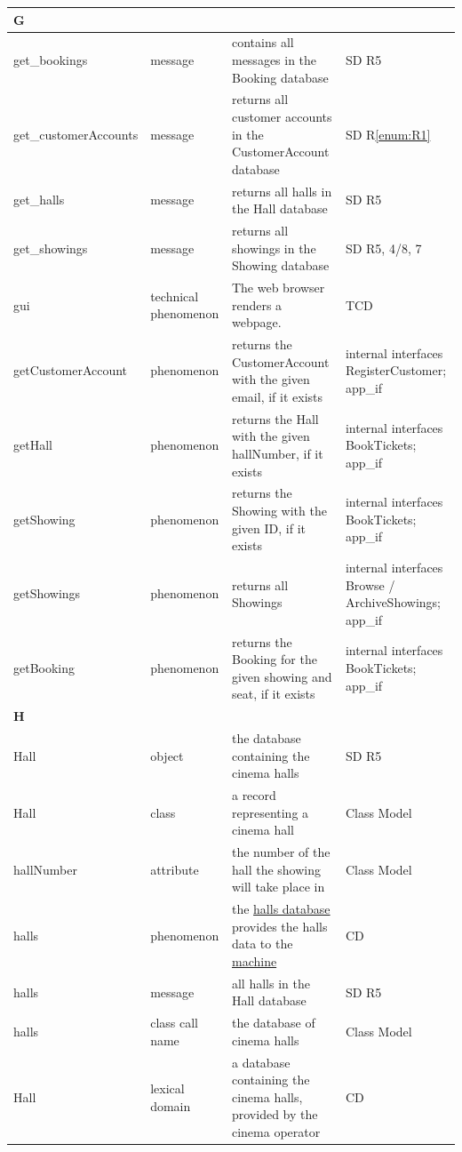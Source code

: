 \documentclass[a4paper,10pt,titlepage,bibtotoc,bibtotocnumbered]{scrreprt}
\begin{document}
\begin{longtable}{|p{.4\linewidth}|p{.2\linewidth}|p{.2\linewidth}|p{.2\linewidth}|}
\hline
\multicolumn{4}{|l|}{\textbf{G}}\\
\hline
get\_bookings & message & contains all messages in the Booking database & SD R5\\
\hline
get\_customerAccounts & message & returns all customer accounts in the CustomerAccount database & SD R\ref{enum:R1}\\
\hline
get\_halls & message & returns all halls in the Hall database & SD R5\\
\hline
get\_showings & message & returns all showings in the Showing database & SD R5, 4/8, 7\\
\hline
gui & technical phenomenon & The web browser renders a webpage. & TCD\\
\hline
getCustomerAccount & phenomenon & returns the CustomerAccount with the given email, if it exists & internal interfaces RegisterCustomer; app\_if\\
\hline
getHall & phenomenon & returns the Hall with the given hallNumber, if it exists & internal interfaces BookTickets; app\_if\\
\hline
getShowing & phenomenon & returns the Showing with the given ID, if it exists & internal interfaces BookTickets; app\_if\\
\hline
getShowings & phenomenon & returns all Showings & internal interfaces Browse / ArchiveShowings; app\_if\\
\hline
getBooking & phenomenon & returns the Booking for the given showing and seat, if it exists & internal interfaces BookTickets; app\_if\\
\hline
\multicolumn{4}{|l|}{\textbf{H}}\\
\hline
Hall & object & the database containing the cinema halls & SD R5\\
\hline
Hall & class & a record representing a cinema hall & Class Model\\
\hline
hallNumber & attribute & the number of the hall the showing will take place in & Class Model\\
\hline
\hypertarget{glossary:halls}{halls} & phenomenon & the \hyperlink{glossary:Hall}{halls database} provides the halls data to the \hyperlink{glossary:UDEKino}{machine} & CD\\
\hline
halls & message & all halls in the Hall database & SD R5\\
\hline
halls & class call name & the database of cinema halls & Class Model\\
\hline
\hypertarget{glossary:Hall}{Hall} & lexical domain & a database containing the cinema halls, provided by the cinema operator & CD\\

\end{longtable}
\end{document}
